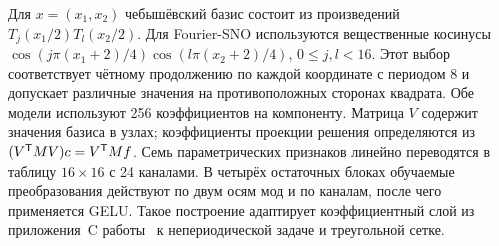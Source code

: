 Для $x=(x_1,x_2)$ чебышёвский базис состоит из произведений $T_j(x_1/2)T_l(x_2/2)$. Для Fourier-SNO используются вещественные косинусы $\cos(j\pi(x_1+2)/4)\cos(l\pi(x_2+2)/4)$, $0\le j,l<16$. Этот выбор соответствует чётному продолжению по каждой координате с периодом 8 и допускает различные значения на противоположных сторонах квадрата. Обе модели используют 256 коэффициентов на компоненту. Матрица $V$ содержит значения базиса в узлах; коэффициенты проекции решения определяются из $(V^\mathsf T M V)c=V^\mathsf T M f$. Семь параметрических признаков линейно переводятся в таблицу $16\times16$ с 24 каналами. В четырёх остаточных блоках обучаемые преобразования действуют по двум осям мод и по каналам, после чего применяется GELU. Такое построение адаптирует коэффициентный слой из приложения~C работы~\cite{fo} к непериодической задаче и треугольной сетке.
